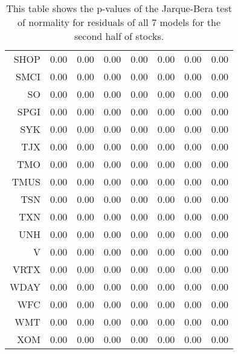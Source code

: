 \begin{table}[ht]
\begin{tabular}{rrrrrrrr}
  SHOP & 0.00 & 0.00 & 0.00 & 0.00 & 0.00 & 0.00 & 0.00 \\ 
  SMCI & 0.00 & 0.00 & 0.00 & 0.00 & 0.00 & 0.00 & 0.00 \\ 
  SO & 0.00 & 0.00 & 0.00 & 0.00 & 0.00 & 0.00 & 0.00 \\ 
  SPGI & 0.00 & 0.00 & 0.00 & 0.00 & 0.00 & 0.00 & 0.00 \\ 
  SYK & 0.00 & 0.00 & 0.00 & 0.00 & 0.00 & 0.00 & 0.00 \\ 
  TJX & 0.00 & 0.00 & 0.00 & 0.00 & 0.00 & 0.00 & 0.00 \\ 
  TMO & 0.00 & 0.00 & 0.00 & 0.00 & 0.00 & 0.00 & 0.00 \\ 
  TMUS & 0.00 & 0.00 & 0.00 & 0.00 & 0.00 & 0.00 & 0.00 \\ 
  TSN & 0.00 & 0.00 & 0.00 & 0.00 & 0.00 & 0.00 & 0.00 \\ 
  TXN & 0.00 & 0.00 & 0.00 & 0.00 & 0.00 & 0.00 & 0.00 \\ 
  UNH & 0.00 & 0.00 & 0.00 & 0.00 & 0.00 & 0.00 & 0.00 \\ 
  V & 0.00 & 0.00 & 0.00 & 0.00 & 0.00 & 0.00 & 0.00 \\ 
  VRTX & 0.00 & 0.00 & 0.00 & 0.00 & 0.00 & 0.00 & 0.00 \\ 
  WDAY & 0.00 & 0.00 & 0.00 & 0.00 & 0.00 & 0.00 & 0.00 \\ 
  WFC & 0.00 & 0.00 & 0.00 & 0.00 & 0.00 & 0.00 & 0.00 \\ 
  WMT & 0.00 & 0.00 & 0.00 & 0.00 & 0.00 & 0.00 & 0.00 \\ 
  XOM & 0.00 & 0.00 & 0.00 & 0.00 & 0.00 & 0.00 & 0.00 \\ 
   \hline
\end{tabular}
\caption[p-values of Jarque-Bera test on model residuals (2)]{This table shows the p-values of the Jarque-Bera test of normality for residuals 
              of all 7 models for the second half of stocks.} 
\label{Table:JBresid_p_vals_2}
\end{table}
